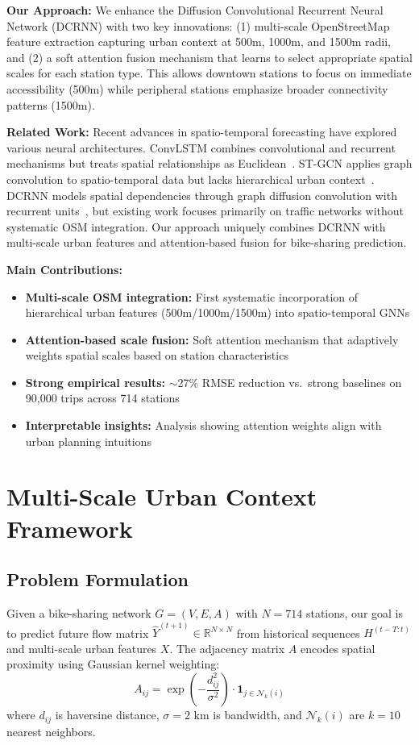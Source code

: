 \documentclass[10pt,twocolumn]{article}
\begin{document}
\textbf{Our Approach:} We enhance the Diffusion Convolutional Recurrent Neural Network (DCRNN) with two key innovations: (1) multi-scale OpenStreetMap feature extraction capturing urban context at 500m, 1000m, and 1500m radii, and (2) a soft attention fusion mechanism that learns to select appropriate spatial scales for each station type. This allows downtown stations to focus on immediate accessibility (500m) while peripheral stations emphasize broader connectivity patterns (1500m).

\textbf{Related Work:} Recent advances in spatio-temporal forecasting have explored various neural architectures. ConvLSTM combines convolutional and recurrent mechanisms but treats spatial relationships as Euclidean~\cite{xingjian2015}. ST-GCN applies graph convolution to spatio-temporal data but lacks hierarchical urban context~\cite{yu2018}. DCRNN models spatial dependencies through graph diffusion convolution with recurrent units~\cite{li2018}, but existing work focuses primarily on traffic networks without systematic OSM integration. Our approach uniquely combines DCRNN with multi-scale urban features and attention-based fusion for bike-sharing prediction.

\textbf{Main Contributions:}
\begin{itemize}
\item \textbf{Multi-scale OSM integration:} First systematic incorporation of hierarchical urban features (500m/1000m/1500m) into spatio-temporal GNNs
\item \textbf{Attention-based scale fusion:} Soft attention mechanism that adaptively weights spatial scales based on station characteristics  
\item \textbf{Strong empirical results:} $\sim$27\% RMSE reduction vs.\ strong baselines on 90,000 trips across 714 stations
\item \textbf{Interpretable insights:} Analysis showing attention weights align with urban planning intuitions
\end{itemize}

\section{Multi-Scale Urban Context Framework}

\subsection{Problem Formulation}
Given a bike-sharing network $G = (V, E, A)$ with $N=714$ stations, our goal is to predict future flow matrix $\hat{Y}^{(t+1)} \in \mathbb{R}^{N \times N}$ from historical sequences $H^{(t-T:t)}$ and multi-scale urban features $X$. The adjacency matrix $A$ encodes spatial proximity using Gaussian kernel weighting:
\begin{equation}
A_{ij} = \exp\left(-\frac{d_{ij}^2}{\sigma^2}\right) \cdot \mathbf{1}_{j \in \mathcal{N}_k(i)}
\end{equation}
where $d_{ij}$ is haversine distance, $\sigma=2$ km is bandwidth, and $\mathcal{N}_k(i)$ are $k=10$ nearest neighbors.
\end{document}
